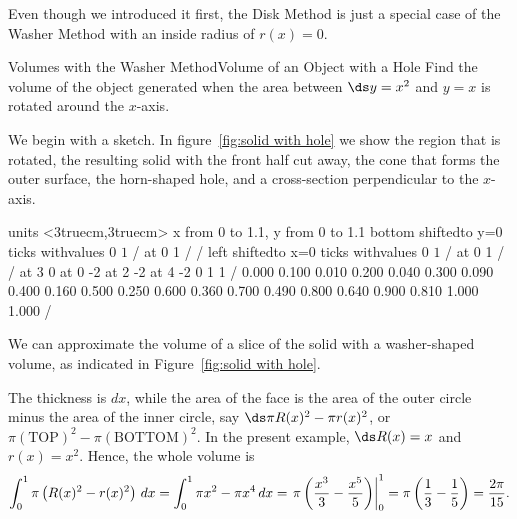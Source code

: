 %
Even though we introduced it first, the Disk Method is just a special case of the Washer Method with an inside radius of $r(x)=0$.		\\


\begin{example}{Volumes with the Washer Method}{Volume of an Object with a Hole}\label{Volume of an Object with a Hole}
Find the volume of the object generated when the area between
$\ds y=x^2$ and $y=x$ is rotated around the $x$-axis. 
\end{example}

\begin{solution}
 We begin with a sketch. In figure~\ref{fig:solid with hole} we show the region
that is rotated, the resulting solid with the front half cut away,
the cone that forms the outer surface, the
horn-shaped hole, and a cross-section perpendicular to the $x$-axis.

\figure[H]
\centerline{\vbox{\beginpicture
\normalgraphs
\setcoordinatesystem units <3truecm,3truecm>
\setplotarea x from 0 to 1.1, y from 0 to 1.1
\axis bottom shiftedto y=0 ticks withvalues {$0$} {$1$} / at 0 1 / /
\axis left shiftedto x=0 ticks withvalues {$0$} {$1$} / at 0 1 / /
 at 3 0
 at 0 -2
 at 2 -2
 at 4 -2
 0 1 1 /
\setquadratic
{} 0.000 0.100 0.010 0.200 0.040 0.300 0.090 0.400 0.160 
0.500 0.250 0.600 0.360 0.700 0.490 0.800 0.640 0.900 0.810 
1.000 1.000 /
\endpicture}}
\caption{\label{fig:solid with hole}
Solid with a hole, showing the outer cone and the shape to
be removed to form the hole.}
\endfigure

We can approximate the volume of a slice of the solid with a washer-shaped volume, as indicated in
Figure~\ref{fig:solid with hole}.

The thickness is $dx$, while the area of
the face is the area of the outer circle minus the area of the inner
circle, say $\ds \pi R(x)^2-\pi r(x)^2$, or $\pi(\text{TOP})^2-\pi(\text{BOTTOM})^2$. In the present example,  $\ds R(x)= x$ and $r(x) =  x^2$. Hence, the whole volume is
$$
  \int_0^1 \pi\left(R(x)^2-r(x)^2\right)\,dx=
  \int_0^1 \pi x^2-\pi x^4\,dx=
  \left.\pi\left({x^3\over3}-{x^5\over5}\right)\right|_0^1=
  \pi\left({1\over3}-{1\over5}\right)={2\pi\over15}.
$$
\end{solution}




